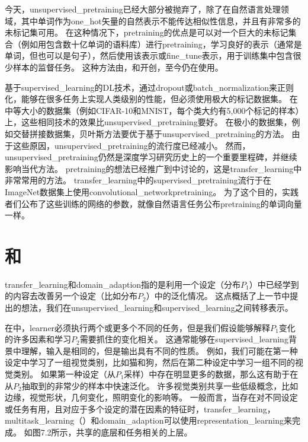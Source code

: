 
今天，\gls{unsupervised_pretraining}已经大部分被抛弃了，除了在自然语言处理领域，其中单词作为\gls{one_hot}矢量的自然表示不能传达相似性信息，并且有非常多的未标记集可用。
在这种情况下，\gls{pretraining}的优点是可以对一个巨大的未标记集合（例如用包含数十亿单词的语料库）进行\gls{pretraining}，学习良好的表示（通常是单词，但也可以是句子），然后使用该表示或\gls{fine_tune}表示，用于训练集中包含很少样本的监督任务。
这种方法由\cite{CollobertR2008-small}，\cite{Turian+Ratinov+Bengio-2010-small}和\cite{collobert2011natural}开创，至今仍在使用。


基于\gls{supervised_learning}的\gls{DL}技术，通过\gls{dropout}或\gls{batch_normalization}来正则化，能够在很多任务上实现人类级别的性能，但必须使用极大的标记数据集。
在中等大小的数据集（例如CIFAR-10和MNIST，每个类大约有5,000个标记的样本）上，这些相同技术的效果比\gls{unsupervised_pretraining}要好。
在极小的数据集，例如交替拼接数据集，贝叶斯方法要优于基于\gls{unsupervised_pretraining}的方法\citep{Srivastava-master-small}。
由于这些原因，\gls{unsupervised_pretraining}的流行度已经减小。
然而，\gls{unsupervised_pretraining}仍然是深度学习研究历史上的一个重要里程碑，并继续影响当代方法。
\gls{pretraining}的想法已经推广到中讨论的，这是\gls{transfer_learning}中非常常用的方法。
\gls{transfer_learning}中的\gls{supervised_pretraining}流行\citep{Oquab-et-al-CVPR2014,yosinski-nips2014}于在ImageNet数据集上使用\gls{convolutional_network}\gls{pretraining}。
为了这个目的，实践者们公布了这些训练的网络的参数，就像自然语言任务公布\gls{pretraining}的单词向量一样\citep{collobert2011natural,Mikolov-et-al-ICLR2013}。


\section{和}
\label{sec:transfer_learning_and_domain_adaptation}
\gls{transfer_learning}和\gls{domain_adaption}指的是利用一个设定（分布$P_1$）中已经学到的内容去改善另一个设定（比如分布$P_2$）中的泛化情况。
这点概括了上一节中提出的想法，我们在\gls{unsupervised_learning}和\gls{supervised_learning}之间转移表示。


在中，\gls{learner}必须执行两个或更多个不同的任务，但是我们假设能够解释$P_1$变化的许多因素和学习$P_2$需要抓住的变化相关。
这通常能够在\gls{supervised_learning}背景中理解，输入是相同的，但是输出具有不同的性质。
例如，我们可能在第一种设定中学习了一组视觉类别，比如猫和狗，然后在第二种设定中学习一组不同的视觉类别。
如果第一种设定（从$P_1$采样）中存在明显更多的数据，那么这有助于在从$P_2$抽取到的非常少的样本中快速泛化。
许多视觉类别共享一些低级概念，比如边缘，视觉形状，几何变化，照明变化的影响等。
一般而言，当存在对不同设定或任务有用，且对应于多个设定的潜在因素的特征时，\gls{transfer_learning}，\gls{multitask_learning}（）和\gls{domain_adaption}可以使用\gls{representation_learning}来完成。
如图7.2所示，共享的底层和任务相关的上层。


